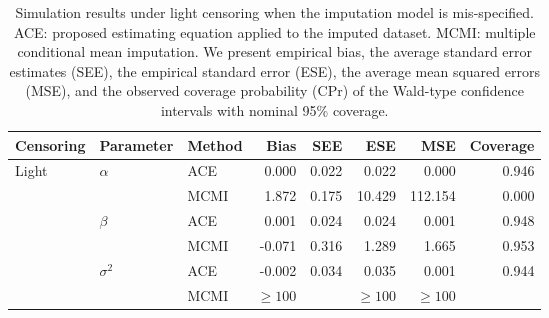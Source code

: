 \documentclass[12pt]{article}
\begin{document}
\begin{table}[hbt!]
\footnotesize
\centering
\begin{tabular}{lllrrrrr}
  \hline
Censoring & Parameter & Method & Bias & SEE & ESE & MSE & Coverage \\ 
  \hline
  Light & $\alpha$ & ACE & 0.000 & 0.022 & 0.022 & 0.000 & 0.946 \\ 
  &  & MCMI & 1.872 & 0.175 & 10.429 & 112.154 & 0.000 \\ 
  & $\beta$ & ACE & 0.001 & 0.024 & 0.024 & 0.001 & 0.948 \\ 
  &  & MCMI & -0.071 & 0.316 & 1.289 & 1.665 & 0.953 \\ 
  & $\sigma^2$ & ACE & -0.002 & 0.034 & 0.035 & 0.001 & 0.944 \\ 
  &  & MCMI & $\geq 100$ &  & $\geq 100$ & $\geq 100$ &  \\
   \hline
\end{tabular}
\caption{Simulation results under light censoring when the imputation model is mis-specified. ACE: proposed estimating equation applied to the imputed dataset. MCMI: multiple conditional mean imputation. We present empirical bias, the average standard error estimates (SEE), the empirical standard error (ESE), the average mean squared errors (MSE), and the observed coverage probability (CPr) of the Wald-type confidence intervals with nominal 95\% coverage.}
\label{table:mis_spec_results_light}
\end{table}
\end{document}
